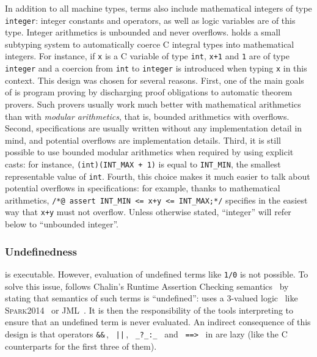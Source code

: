In addition to all machine types, \eacsl terms also include mathematical
integers of type  \lstinline{integer}: integer constants and operators, as well as logic variables are of
this type. Integer arithmetics is unbounded and never
overflows. \eacsl holds a small subtyping system to automatically coerce C
integral types into mathematical integers. For instance, if \lstinline{x} is a C
variable of type \lstinline{int}, \lstinline{x+1} and \lstinline{1} are of type
\lstinline{integer} and a coercion from \lstinline{int} to \lstinline{integer} is
introduced when typing \lstinline{x} in this context. This design was chosen for
several reasons. First, one of the main goals of \framac is program proving by
discharging proof obligations to automatic theorem provers. Such provers usually
work much better with mathematical arithmetics than with \textit{modular
  arithmetics}, that is, bounded arithmetics with overflows.  Second,
specifications are usually written without any implementation detail in mind,
and potential overflows are implementation details. Third, it is still possible
to use bounded modular arithmetics when required by using explicit casts: for
instance, \lstinline{(int)(INT_MAX + 1)} is equal to \lstinline{INT_MIN}, the
smallest representable value of \lstinline{int}. Fourth, this choice makes it
much easier to talk about potential overflows in specifications: for example,
thanks to mathematical arithmetics, 
\lstinline{/*@ assert INT_MIN <= x+y <= INT_MAX;*/} specifies in the easiest way
that \lstinline{x+y} must not overflow.
Unless otherwise stated, ``integer'' will refer below to ``unbounded integer''.

\subsubsection{Undefinedness}\label{sec:undefined}

\eacsl is executable. However, evaluation of undefined terms like \lstinline{1/0} is not
possible. To solve this issue, \eacsl follows Chalin's Runtime Assertion
Checking semantics~\cite{chalin10} by stating that semantics of such terms is
``undefined'': \eacsl uses a 3-valued logic~\cite{konikowska91} like
\textsc{Spark2014}~\cite{sparkERTS2014} or \textsc{JML}~\cite{assert}. It is
then the responsibility of the tools interpreting \eacsl{} to ensure that an
undefined term is never evaluated. An indirect consequence of this design is
that operators \lstinline{&&}\,, \ \lstinline{||}\,, \ \lstinline{_?_:_} \ and
\ \lstinline{==>} \ in \eacsl are lazy (like the C counterparts for the first
three of them).


